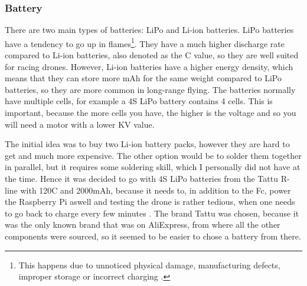 \documentclass[svgnames]{article}
\begin{document}
	
	\subsubsection{Battery}
	There are two main types of batteries: \gls{LiPo} and \gls{Li-ion} batteries. \gls{LiPo} batteries have a tendency to go up in flames\footnote{This happens due to unnoticed physical damage, manufacturing defects, improper storage or incorrect charging \cite{lipofires}.}. They have a much higher discharge rate compared to \gls{Li-ion} batteries, also denoted as the C value, so they are well suited for racing drones. However, \gls{Li-ion} batteries have a higher energy density, which means that they can store more mAh for the same weight compared to \gls{LiPo} batteries, so they are more common in long-range flying. The batteries normally have multiple cells, for example a 4S \gls{LiPo} battery contains 4 cells. This is important, because the more cells you have, the higher is the voltage and so you will need a motor with a lower KV value. 

	 
	The initial idea was to buy two \gls{Li-ion} battery packs, however they are hard to get and much more expensive. The other option would be to solder them together in parallel, but it requires some soldering skill, which I personally did not have at the time. Hence it was decided to go with 4S \gls{LiPo} batteries from the Tattu R-line with 120C and 2000mAh, because it needs to, in addition to the \gls{Fc}, power the Raspberry Pi aswell and testing the drone is rather tedious, when one needs to go back to charge every few minutes \cite{tattu}. The brand Tattu was chosen, because it was the only known brand that was on AliExpress, from where all the other components were sourced, so it seemed to be easier to chose a battery from there. 
\end{document}
